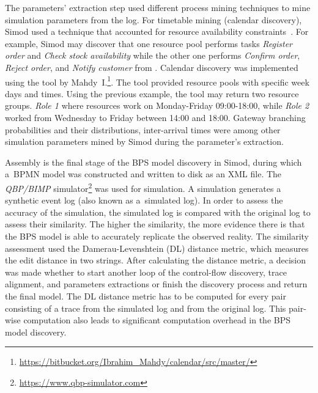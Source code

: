 \documentclass[12pt]{article}
\begin{document}

The parameters' extraction step used different process mining techniques to mine simulation parameters from the log.
For timetable mining (calendar discovery), Simod used a technique that accounted for resource availability constraints~\cite{DBLP:journals/dke/Estrada-TorresC21}.
For example, Simod may discover that one resource pool performs tasks \emph{Register order} and \emph{Check stock availability} while the other one performs \emph{Confirm order}, \emph{Reject order}, and \emph{Notify customer} from .
Calendar discovery was implemented using the tool by Mahdy~I.\footnote{\href{https://bitbucket.org/Ibrahim_Mahdy/calendar/src/master/}{https://bitbucket.org/Ibrahim\_Mahdy/calendar/src/master/}}.
The tool provided resource pools with specific week days and times.
Using the previous example, the tool may return two resource groups. \emph{Role 1} where resources work on Monday-Friday 09:00-18:00, while \emph{Role 2} worked from Wednesday to Friday between 14:00 and 18:00. 
Gateway branching probabilities and their distributions, inter-arrival times were among other simulation parameters mined by Simod during the parameter's extraction.

Assembly is the final stage of the BPS model discovery in Simod, during which a~BPMN model was constructed and written to disk as an XML file. 
The \emph{QBP/BIMP} simulator\footnote{\href{https://www.qbp-simulator.com}{https://www.qbp-simulator.com}} was used for simulation. 
A simulation generates a synthetic event log (also known as a~simulated log). 
In order to assess the accuracy of the simulation, the simulated log is compared with the original log to assess their similarity. 
The higher the similarity, the more evidence there is that the BPS model is able to accurately replicate the observed reality. 
The similarity assessment used the Damerau-Levenshtein (DL) distance metric, which measures the edit distance in two strings. 
After calculating the distance metric, a decision was made whether to start another loop of the control-flow discovery, trace alignment, and parameters extractions or finish the discovery process and return the final model. 
The DL distance metric has to be computed for every pair consisting of a trace from the simulated log and from the original log.
This pair-wise computation also leads to significant computation overhead in the BPS model discovery.
\end{document}
